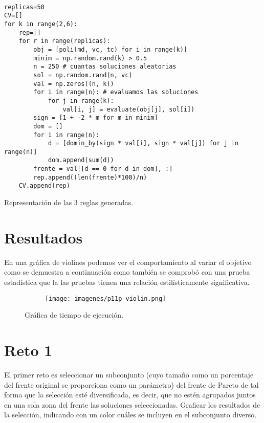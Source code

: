 \documentclass{article}
\begin{document}
\begin{listing}[H]
\begin{verbatim}

replicas=50
CV=[]
for k in range(2,6):
    rep=[]
    for r in range(replicas):
        obj = [poli(md, vc, tc) for i in range(k)]
        minim = np.random.rand(k) > 0.5
        n = 250 # cuantas soluciones aleatorias
        sol = np.random.rand(n, vc)
        val = np.zeros((n, k))
        for i in range(n): # evaluamos las soluciones
            for j in range(k):
                val[i, j] = evaluate(obj[j], sol[i])
        sign = [1 + -2 * m for m in minim]
        dom = []
        for i in range(n):
            d = [domin_by(sign * val[i], sign * val[j]) for j in range(n)]
            dom.append(sum(d)) 
        frente = val[[d == 0 for d in dom], :]
        rep.append((len(frente)*100)/n)
    CV.append(rep)

  \end{verbatim}
  \label{lst:fibo}
  \caption{Representación de las 3 reglas generadas.}
   \end{listing}


\newpage
\section{Resultados}
En una gráfica de violines podemos ver el comportamiento al variar el objetivo como se demuestra a continuación como también se comprobó con una prueba estadística que la las pruebas tienen una relación estilísticamente significativa.


\begin{figure}[H]
\centering
\begin{subfigure}[b]{.50\linewidth}
\texttt{[image: imagenes/p11p\_violin.png]}
\end{subfigure}
\caption{Gráfica de tiempo de ejecución.}
\label{fig:westminster}
\end{figure}






\newpage
\section{Reto 1}
El primer reto es seleccionar un subconjunto (cuyo tamaño como un porcentaje del frente original se proporciona como un parámetro) del frente de Pareto de tal forma que la selección esté diversificada, es decir, que no estén agrupados juntos en una sola zona del frente las soluciones seleccionadas. Graficar los resultados de la selección, indicando con un color cuáles se incluyen en el subconjunto diverso.
\end{document}
